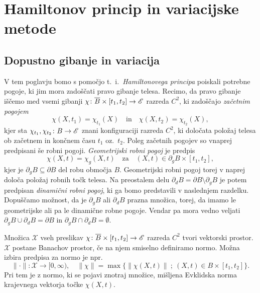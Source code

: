\chapter{Hamiltonov princip in variacijske metode}


\section{Dopustno gibanje in variacija}


V tem poglavju bomo s pomočjo t.~i.~\emph{Hamiltonovega principa} poiskali potrebne pogoje,
ki jim mora zadoščati pravo gibanje telesa.
Recimo, da pravo gibanje iščemo med vsemi gibanji
$\chi\colon \overline{B}\times [t_1,t_2]\to\mathscr E$ razreda $C^2$, ki zadoščajo \emph{začetnim pogojem}
\[ \chi(X,t_1)=\chi_{t_1}(X)\quad\textrm{in}\quad \chi(X,t_2)=\chi_{t_2}(X), \]
kjer sta $\chi_{t_1},\chi_{t_2}\colon B\to\mathscr E$ znani konfiguraciji razreda $C^2$, ki
določata položaj telesa ob začetnem in končnem času $t_1$ oz.~$t_2$.
Poleg začetnih pogojev so vnaprej predpisani še robni pogoji. \emph{Geometrijski robni pogoj} je predpis
\begin{equation*} \label{e:grp}
	\chi(X,t)=\chi_g(X,t)\quad\mathrm{za}\quad (X,t)\in \partial_g B\times [t_1,t_2],
\end{equation*}
kjer je $\partial_g B\subseteq\partial B$ del robu območja $B$.
Geometrijski robni pogoj torej v naprej določa položaj robnih točk telesa.
Na preostalem delu $\partial_d B=\partial B \setminus \partial_g B$
je potem predpisan \emph{dinamični robni pogoj}, ki ga bomo predstavili v naslednjem razdelku.
Dopuščamo možnost, da je $\partial_g B$ ali $\partial_d B$ prazna množica, torej,
da imamo le geometrijske ali pa le dinamične robne pogoje. Vendar pa mora vedno veljati
$\partial_g B\cup\partial_d B=\partial B$ in $\partial_g B\cap\partial_d B=\emptyset$.

Množica $\mathcal{X}$ vseh preslikav $\chi\colon\overline{B}\times [t_1,t_2]\to\mathscr E$
razreda $C^2$ tvori vektorski prostor.
$\mathcal{X}$ postane Banachov prostor, če na njem smiselno definiramo normo. Možna izbira
predpisa za normo je npr.
\[
	\|\cdot\|\colon\mathcal{X}\to[0,\infty),\quad
	\|\chi\|=\max\big\{\|\chi(X,t)\|\: ;\ (X,t)\in B\times [t_1,t_2]\big\}.
\]
Pri tem je z normo, ki se pojavi znotraj množice, mišljena Evklidska norma krajevnega vektorja točke $\chi(X,t)$.

